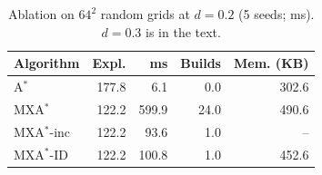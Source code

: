 \begin{table}[t]
\centering
\caption{Ablation on $64^2$ random grids at $d=0.2$ (5 seeds; ms). $d=0.3$ is in the text.}
\label{tab:ablation}
\footnotesize
\setlength{\tabcolsep}{3.5pt}
\begin{tabular}{lrrrr}
\toprule
Algorithm & Expl. & ms & Builds & Mem. (KB) \\
\midrule
A$^*$ & 177.8 & 6.1 & 0.0 & 302.6 \\
MXA$^*$ & 122.2 & 599.9 & 24.0 & 490.6 \\
MXA$^*$-inc & 122.2 & 93.6 & 1.0 & -- \\
MXA$^*$-ID & 122.2 & 100.8 & 1.0 & 452.6 \\
\bottomrule
\end{tabular}
\end{table}
